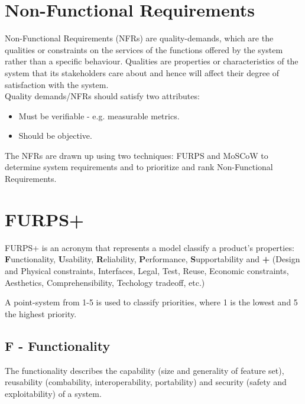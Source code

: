 



\section{Non-Functional Requirements}
Non-Functional Requirements (NFRs) are quality-demands, which are the qualities or constraints on the services of the functions offered by the system rather than a specific behaviour. Qualities are properties or characteristics of the system that its stakeholders care about and hence will affect their degree of satisfaction with the system. \\
Quality demands/NFRs should satisfy two attributes: \\
\begin{itemize}
\item Must be verifiable - e.g. measurable metrics.
\item Should be objective.
\end{itemize}

The NFRs are drawn up using two techniques: FURPS and MoSCoW to determine system requirements and to prioritize and rank Non-Functional Requirements. \\

\section{FURPS+}
FURPS+ is an acronym that represents a model classify a product's properties: \textbf{F}unctionality, \textbf{U}sability, \textbf{R}eliability, \textbf{P}erformance, \textbf{S}upportability and \textbf{+} (Design and Physical constraints, Interfaces, Legal, Test, Reuse, Economic constraints, Aesthetics, Comprehensibility, Techology tradeoff, etc.)  \newline

A point-system from 1-5 is used to classify priorities, where 1 is the lowest and 5 the highest priority. \\

\subsection{\textbf{F} - Functionality}
The functionality describes the capability (size and generality of feature set), reusability (combability, interoperability, portability) and security (safety and exploitability) of a system. \\


